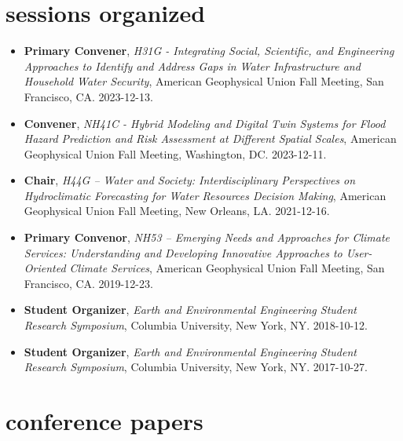 \documentclass[10pt,oneside]{article}
\begin{document}

\section{sessions organized}

\mbox{}\vspace{-\dimexpr\baselineskip\relax}

\begin{itemize}[label={}]

  \item \textbf{Primary Convener}, \textit{H31G - Integrating Social, Scientific, and Engineering Approaches to Identify and Address Gaps in Water Infrastructure and Household Water Security}, American Geophysical Union Fall Meeting, San Francisco, CA. 2023-12-13.

  \item \textbf{Convener}, \textit{NH41C - Hybrid Modeling and Digital Twin Systems for Flood Hazard Prediction and Risk Assessment at Different Spatial Scales}, American Geophysical Union Fall Meeting, Washington, DC. 2023-12-11.

  \item \textbf{Chair}, \textit{H44G -- Water and Society: Interdisciplinary Perspectives on Hydroclimatic Forecasting for Water Resources Decision Making}, American Geophysical Union Fall Meeting, New Orleans, LA. 2021-12-16.

  \item \textbf{Primary Convenor}, \textit{NH53 -- Emerging Needs and Approaches for Climate Services: Understanding and Developing Innovative Approaches to User-Oriented Climate Services}, American Geophysical Union Fall Meeting, San Francisco, CA. 2019-12-23.

  \item \textbf{Student Organizer}, \textit{Earth and Environmental Engineering Student Research Symposium}, Columbia University, New York, NY. 2018-10-12.

  \item \textbf{Student Organizer}, \textit{Earth and Environmental Engineering Student Research Symposium}, Columbia University, New York, NY. 2017-10-27.

\end{itemize}

\section{conference papers}
\end{document}

